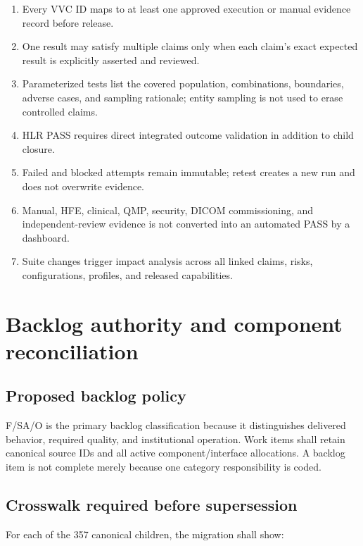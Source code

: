 \documentclass[11pt,letterpaper]{article}
\begin{document}
\begin{enumerate}
\item Every VVC ID maps to at least one approved execution or manual evidence record before release.
\item One result may satisfy multiple claims only when each claim's exact expected result is explicitly asserted and reviewed.
\item Parameterized tests list the covered population, combinations, boundaries, adverse cases, and sampling rationale; entity sampling is not used to erase controlled claims.
\item HLR PASS requires direct integrated outcome validation in addition to child closure.
\item Failed and blocked attempts remain immutable; retest creates a new run and does not overwrite evidence.
\item Manual, HFE, clinical, QMP, security, DICOM commissioning, and independent-review evidence is not converted into an automated PASS by a dashboard.
\item Suite changes trigger impact analysis across all linked claims, risks, configurations, profiles, and released capabilities.
\end{enumerate}

\section{Backlog authority and component reconciliation}

\subsection{Proposed backlog policy}

F/SA/O is the primary backlog classification because it distinguishes delivered behavior, required quality, and institutional operation. Work items shall retain canonical source IDs and all active component/interface allocations. A backlog item is not complete merely because one category responsibility is coded.

\subsection{Crosswalk required before supersession}

For each of the 357 canonical children, the migration shall show:
\end{document}
